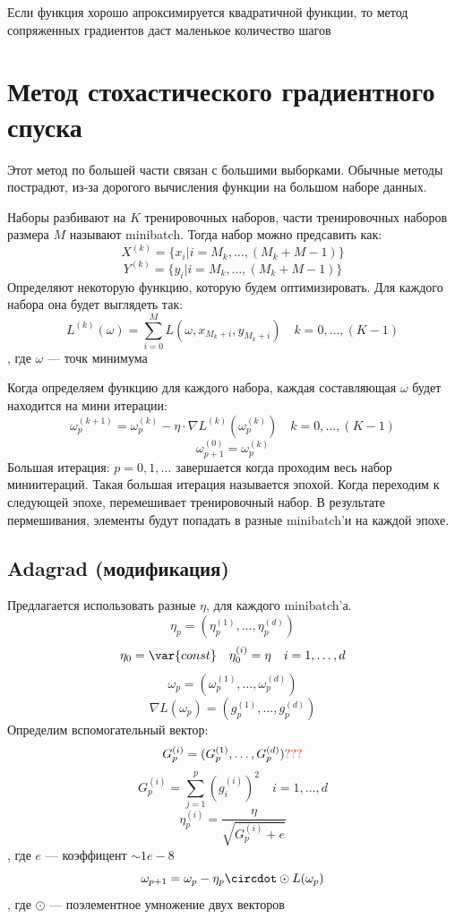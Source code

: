 \documentclass[oneside]{book}
\newcommand{\const}{\var{const}}
\theoremstyle{plain}
\theoremstyle{remark}
\theoremstyle{definition}
\begin{document}
Если функция хорошо апроксимируется квадратичной функции, то метод сопряженных градиентов даст маленькое количество шагов
\section{Метод стохастического градиентного спуска}
\label{sec:org359577b}
Этот метод по большей части связан с большими выборками. Обычные методы пострадют, из-за дорогого вычисления функции на большом наборе данных.

Наборы разбивают на \(K\) тренировочных наборов, части тренировочных наборов размера \(M\) называют minibatch. Тогда набор можно предсавить как:
\[ X^{(k)} = \{x_i | i = M_k,\dots,(M_k + M - 1)\} \]
\[ Y^{(k)} = \{y_i | i = M_k,\dots,(M_k + M - 1)\} \]
Определяют некоторую функцию, которую будем оптимизировать. Для каждого набора она будет выглядеть так:
\[ L^{(k)}(\omega) = \sum_{i = 0}^M L(\omega, x_{M_k + i}, y_{M_k + i}) \quad k = 0,\dots,(K - 1)\]
, где \(\omega\) --- точк минимума

Когда определяем функцию для каждого набора, каждая составляющая \(\omega\) будет находится на мини итерации:
\[ \omega_p^{(k + 1)} = \omega_p^{(k)} - \eta \cdot \nabla L^{(k)}(\omega_p^{(k)}) \quad k = 0,\dots,(K - 1)\]
\[ \omega^{(0)}_{p + 1} = \omega^{(k)}_p \]
Большая итерация: \(p = 0,1,\dots\) завершается когда проходим весь набор миниитераций. Такая большая итерация называется эпохой. Когда переходим к следующей эпохе, перемешивает тренировочный набор. В результате пермешивания, элементы будут попадать в разные minibatch'и на каждой эпохе.

\subsection{Adagrad (модификация)}
\label{sec:orgc39ac81}
Предлагается использовать разные \(\eta\), для каждого minibatch'а.
\[ \eta_p = (\eta^{(1)}_p,\dots,\eta_p^{(d)}) \]
\[ \eta_0 = \const \quad \eta^{(i)}_0 = \eta \quad i = 1,\dots,d\]
\[ \omega_p = (\omega^{(1)}_p,\dots,\omega^{(d)}_p) \]
\[ \nabla L(\omega_p) = (g^{(1)}_p,\dots,g^{(d)}_p) \]
Определим вспомогательный вектор:
\[ G^{(i)}_p = (G^{(1)}_p,\dots,G^{(d)}_p) \color{red}???\color{black} \]
\[ G^{(i)}_p = \sum_{j = 1}^p (g_i^{(i)})^2 \quad i = 1,\dots,d\]
\[ \eta_p^{(i)} = \frac{\eta}{\sqrt{G^{(i)}_p + e}} \]
, где \(e\) --- коэффицент \(\sim 1e-8\)
\[ \omega_{p + 1} = \omega_p - \eta_p \circdot \odot L(\omega_p) \], где \(\odot\) --- поэлементное умножение двух векторов
\end{document}
